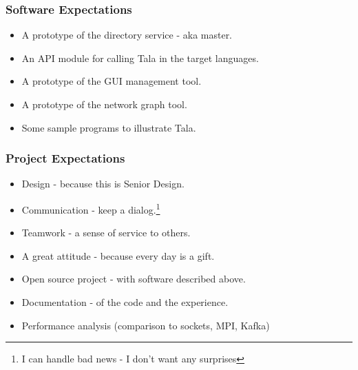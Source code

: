 \documentclass[xcolor=svgnames]{beamer}
\begin{document}
\begin{frame}[fragile]
  \frametitle{Software Expectations}

\begin{itemize}
\item A prototype of the directory service - aka master.
\item An  API module for calling Tala in the target languages.
\item A prototype of the GUI management tool.
\item A prototype of the network graph tool.
\item Some sample programs to illustrate Tala.
\end{itemize}


\end{frame}


\begin{frame}[fragile]
  \frametitle{Project Expectations}

\begin{itemize}
\item Design - because this is Senior Design.
\item Communication - keep a dialog.\footnote{I can handle bad news - I don't want any surprises}
\item Teamwork - a sense of service to others.
\item A great attitude - because every day is a gift.
\item Open source project - with software described above.
\item Documentation - of the code and the experience.
\item Performance analysis (comparison to sockets, MPI, Kafka)
\end{itemize}

\end{frame}
\end{document}
